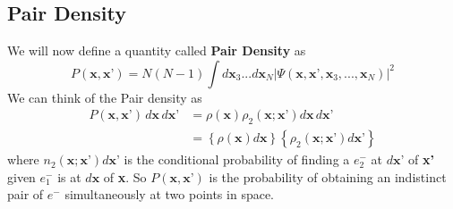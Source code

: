 \documentclass{article}
\begin{document}
 \subsection*{\Large{Pair Density}}
 \begin{Large}
  \begin{flushleft}
  We will now define a quantity called \textbf{Pair Density} as
  \begin{equation}\label{eq:8}
  P(\textbf{x},\textbf{x'}) = N(N-1)\displaystyle{\int}d\textbf{x}_3...d\textbf{x}_N|\Psi(\textbf{x},\textbf{x'},\textbf{x}_3,...,\textbf{x}_N)|^2
  \end{equation}
  We can think of the Pair density as 
  \begin{equation}\label{eq:9}
  \begin{split}
  P(\textbf{x},\textbf{x'})\,d\textbf{x}\,d\textbf{x'} &= \rho(\textbf{x})\rho_2(\textbf{x};\textbf{x'})d\textbf{x}\,d\textbf{x'}\\
  &= \left\lbrace \rho(\textbf{x})d\textbf{x}\right\rbrace \left\lbrace \rho_2(\textbf{x};\textbf{x'})d\textbf{x'}\right\rbrace
  \end{split}
  \end{equation}
  where $n_2(\textbf{x};\textbf{x'})d\textbf{x'}$ is the conditional probability of finding a $e^-_2$ at $d\textbf{x'}$ of \textbf{x'} given $e^-_1$ is at $d\textbf{x}$ of \textbf{x}. So $P(\textbf{x},\textbf{x'})$ is the probability of obtaining an indistinct pair of $e^-$ simultaneously at two points in space.
  

\end{flushleft}
\end{Large}
\end{document}
